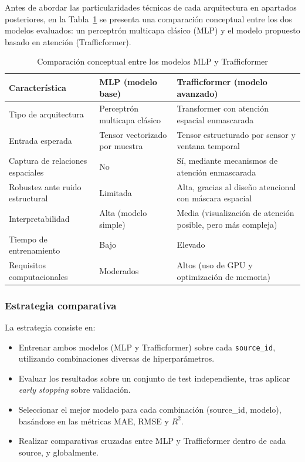 Antes de abordar las particularidades técnicas de cada arquitectura en apartados posteriores, en la Tabla~\ref{tab:mlp_vs_trafficformer} se presenta una comparación conceptual entre los dos modelos evaluados: un perceptrón multicapa clásico (MLP) y el modelo propuesto basado en atención (Trafficformer).

\begin{table}[H]
	\centering
	\caption{Comparación conceptual entre los modelos MLP y Trafficformer}
	\label{tab:mlp_vs_trafficformer}
	\begin{tabularx}{\textwidth}{lXX}
		\toprule
		\textbf{Característica} & \textbf{MLP (modelo base)} & \textbf{Trafficformer (modelo avanzado)} \\
		\midrule
		Tipo de arquitectura & Perceptrón multicapa clásico & Transformer con atención espacial enmascarada \\
		Entrada esperada & Tensor vectorizado por muestra & Tensor estructurado por sensor y ventana temporal \\
		Captura de relaciones espaciales & No & Sí, mediante mecanismos de atención enmascarada \\
		Robustez ante ruido estructural & Limitada & Alta, gracias al diseño atencional con máscara espacial \\
		Interpretabilidad & Alta (modelo simple) & Media (visualización de atención posible, pero más compleja) \\
		Tiempo de entrenamiento & Bajo & Elevado \\
		Requisitos computacionales & Moderados & Altos (uso de GPU y optimización de memoria) \\
		\bottomrule
	\end{tabularx}
\end{table}

\subsubsection*{Estrategia comparativa}

La estrategia consiste en:

\begin{itemize}
	\item Entrenar ambos modelos (MLP y Trafficformer) sobre cada \texttt{source\_id}, utilizando combinaciones diversas de hiperparámetros.
	\item Evaluar los resultados sobre un conjunto de test independiente, tras aplicar \textit{early stopping} sobre validación.
	\item Seleccionar el mejor modelo para cada combinación (source\_id, modelo), basándose en las métricas MAE, RMSE y $R^2$.
	\item Realizar comparativas cruzadas entre MLP y Trafficformer dentro de cada source, y globalmente.
\end{itemize}

